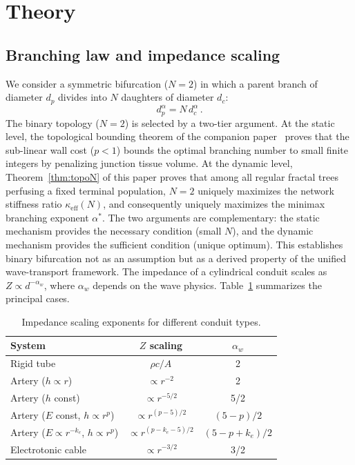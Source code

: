 \documentclass[11pt,a4paper]{article}
\theoremstyle{remark}
\begin{document}
\section{Theory}
\label{sec:theory}

\subsection{Branching law and impedance scaling}

We consider a symmetric bifurcation ($N = 2$) in which a parent branch of
diameter $d_p$ divides into $N$ daughters of diameter $d_c$:
\begin{equation}
  d_p^\alpha = N \, d_c^\alpha \,.
  \label{eq:branchlaw}
\end{equation}
The binary topology ($N = 2$) is selected by a two-tier argument. At the static
level, the topological bounding theorem of the companion
paper~\cite{Marchesi2026static} proves that the sub-linear wall cost ($p < 1$)
bounds the optimal branching number to small finite integers by penalizing
junction tissue volume. At the dynamic level, Theorem~\ref{thm:topoN} of this
paper proves that among all regular fractal trees perfusing a fixed terminal
population, $N = 2$ uniquely maximizes the network stiffness ratio
$\kappa_\mathrm{eff}(N)$, and consequently uniquely maximizes the minimax
branching exponent $\alpha^*$. The two arguments are complementary: the static
mechanism provides the necessary condition (small $N$), and the dynamic
mechanism provides the sufficient condition (unique optimum). This establishes
binary bifurcation not as an assumption but as a derived property of the unified
wave-transport framework.
The impedance of a cylindrical conduit scales as $Z \propto d^{-\alpha_w}$,
where $\alpha_w$ depends on the wave physics.
Table~\ref{tab:alphaw} summarizes the principal cases.

\begin{table}[H]
\centering
\caption{Impedance scaling exponents for different conduit types.}
\label{tab:alphaw}
\small
\begin{tabular}{@{}lcc@{}}
\toprule
System & $Z$ scaling & $\alpha_w$ \\
\midrule
Rigid tube & $\rho c/A$ & 2 \\
Artery ($h\!\propto\!r$) & $\propto r^{-2}$ & 2 \\
Artery ($h$ const) & $\propto r^{-5/2}$ & 5/2 \\
Artery ($E$ const, $h\!\propto\!r^p$) & $\propto r^{(p-5)/2}$ & $(5{-}p)/2$ \\
Artery ($E\!\propto\!r^{-k_e}$, $h\!\propto\!r^p$) & $\propto r^{(p-k_e-5)/2}$ & $(5{-}p{+}k_e)/2$ \\
Electrotonic cable & $\propto r^{-3/2}$ & 3/2 \\
\bottomrule
\end{tabular}
\end{table}
\end{document}
